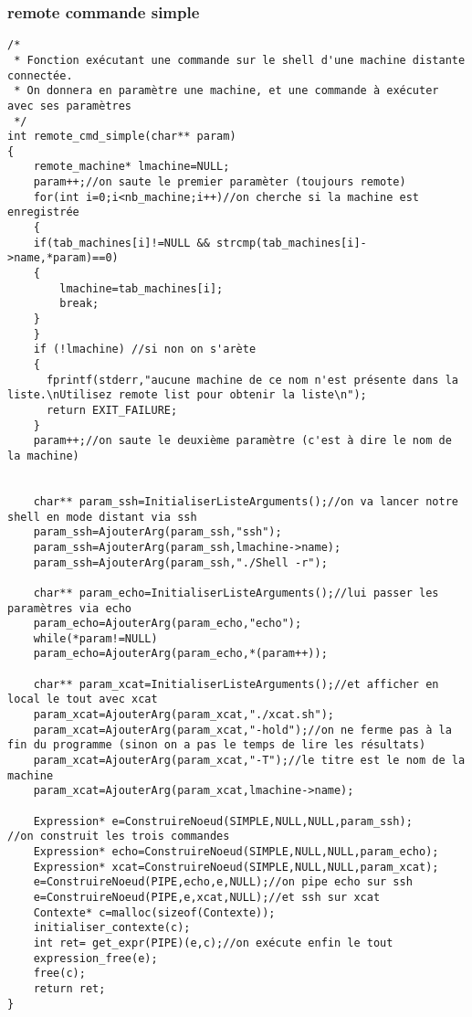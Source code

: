 \documentclass[12pt]{article}
\begin{document}
\subsubsection*{remote commande simple}
\label{remotecmdsmpl}
\begin{verbatim}
/*
 * Fonction exécutant une commande sur le shell d'une machine distante connectée.
 * On donnera en paramètre une machine, et une commande à exécuter avec ses paramètres
 */
int remote_cmd_simple(char** param)
{
    remote_machine* lmachine=NULL;
    param++;//on saute le premier paramèter (toujours remote)
    for(int i=0;i<nb_machine;i++)//on cherche si la machine est enregistrée
    {
	if(tab_machines[i]!=NULL && strcmp(tab_machines[i]->name,*param)==0)
	{
	    lmachine=tab_machines[i];
	    break;
	}
    }
    if (!lmachine) //si non on s'arète
    {
      fprintf(stderr,"aucune machine de ce nom n'est présente dans la liste.\nUtilisez remote list pour obtenir la liste\n");
      return EXIT_FAILURE;
    }
    param++;//on saute le deuxième paramètre (c'est à dire le nom de la machine)
    
    
    char** param_ssh=InitialiserListeArguments();//on va lancer notre shell en mode distant via ssh
    param_ssh=AjouterArg(param_ssh,"ssh");
    param_ssh=AjouterArg(param_ssh,lmachine->name);
    param_ssh=AjouterArg(param_ssh,"./Shell -r");

    char** param_echo=InitialiserListeArguments();//lui passer les paramètres via echo
    param_echo=AjouterArg(param_echo,"echo");
    while(*param!=NULL)
	param_echo=AjouterArg(param_echo,*(param++));
    
    char** param_xcat=InitialiserListeArguments();//et afficher en local le tout avec xcat
    param_xcat=AjouterArg(param_xcat,"./xcat.sh");
    param_xcat=AjouterArg(param_xcat,"-hold");//on ne ferme pas à la fin du programme (sinon on a pas le temps de lire les résultats)
    param_xcat=AjouterArg(param_xcat,"-T");//le titre est le nom de la machine
    param_xcat=AjouterArg(param_xcat,lmachine->name);
    
    Expression* e=ConstruireNoeud(SIMPLE,NULL,NULL,param_ssh);     //on construit les trois commandes
    Expression* echo=ConstruireNoeud(SIMPLE,NULL,NULL,param_echo);
    Expression* xcat=ConstruireNoeud(SIMPLE,NULL,NULL,param_xcat);
    e=ConstruireNoeud(PIPE,echo,e,NULL);//on pipe echo sur ssh
    e=ConstruireNoeud(PIPE,e,xcat,NULL);//et ssh sur xcat
    Contexte* c=malloc(sizeof(Contexte));
    initialiser_contexte(c);
    int ret= get_expr(PIPE)(e,c);//on exécute enfin le tout
    expression_free(e);
    free(c);
    return ret;
}


\end{verbatim}
\end{document}
